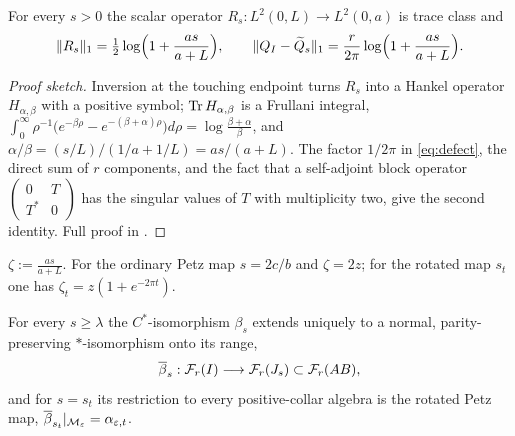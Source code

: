 \begin{theorem}\label{thm:tracenorm}
For every $s>0$ the scalar operator $R_s:L^2(0,L)\to L^2(0,a)$ is trace class and
\begin{equation}\label{eq:Rtrace}
 \lVert R_s\rVert_1=\tfrac12\log\Bigl(1+\frac{as}{a+L}\Bigr),\qquad
 \lVert Q_I-\widetilde Q_s\rVert_1=\frac r{2\pi}\log\Bigl(1+\frac{as}{a+L}\Bigr).
\end{equation}
\end{theorem}

\begin{proof}[Proof sketch]
Inversion at the touching endpoint turns $R_s$ into a Hankel operator
$H_{\alpha,\beta}$ with a positive symbol; $\operatorname{Tr} H_{\alpha,\beta}$ is a Frullani
integral,
$\int_0^\infty\rho^{-1}\bigl(e^{-\beta\rho}-e^{-(\beta+\alpha)\rho}\bigr)d\rho
=\log\frac{\beta+\alpha}\beta$, and $\alpha/\beta=(s/L)/(1/a+1/L)=as/(a+L)$.
The factor $1/2\pi$ in \eqref{eq:defect}, the direct sum of $r$ components, and
the fact that a self-adjoint block operator
$\left(\begin{smallmatrix}0&T\\T^*&0\end{smallmatrix}\right)$ has the singular
values of $T$ with multiplicity two, give the second identity.  Full proof in
\cite[Sec.~6]{Note4}.
\end{proof}

\begin{definition}\label{def:zeta}
$\displaystyle \zeta:=\frac{as}{a+L}$.  For the ordinary Petz map $s=2c/b$ and
$\zeta=2z$; for the rotated map $s_t$ one has $\zeta_t=z(1+e^{-2\pi t})$.
\end{definition}

\begin{theorem}\label{thm:normal}
For every $s\ge\lambda$ the $C^*$-isomorphism $\beta_s$ extends uniquely to a
normal, parity-preserving $*$-isomorphism onto its range,
\begin{equation}\label{eq:betabar}
 \overline\beta_s:\mathcal F_r(I)\longrightarrow\mathcal F_r(J_s)\subset\mathcal F_r(AB),
\end{equation}
and for $s=s_t$ its restriction to every positive-collar algebra is the rotated
Petz map, $\overline\beta_{s_t}|_{\mathcal M_\varepsilon}=\alpha_{\varepsilon,t}$.
\end{theorem}

